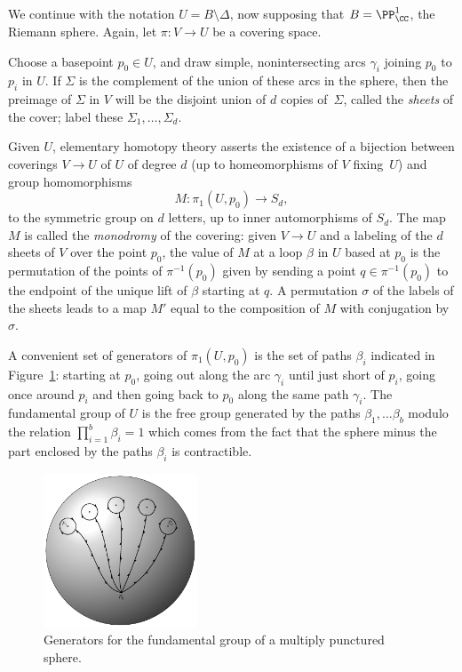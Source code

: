 We continue with the notation $U = B\setminus \Delta$, now supposing
%
that $B = \PP^1_\CC$, the Riemann sphere. Again, let $\pi:V\to U$ be a
covering space.

Choose a basepoint $p_0 \in U$, and draw simple, nonintersecting arcs
$\gamma_i$ joining $p_0$ to $p_i$ in $U$. If $\Sigma$ is the complement
of the union of these arcs in the sphere, then the preimage of $\Sigma$
in $V$ will be the disjoint union of $d$ copies of~$\Sigma$, called the
%
\emph{sheets} of the cover; label these $\Sigma_1,\dots,\Sigma_d$.

Given $U$, elementary homotopy theory asserts the existence of a bijection
between coverings $V \to U$ of $U$ of degree $d$ (up to homeomorphisms
of $V$ fixing~$U$) and group
homomorphisms
   $$
 M:  \pi_1(U, p_0) \to S_d,
   $$
to the symmetric group on $d$ letters, up to inner automorphisms of
%
%
$S_{d}$. The map $M$ is called the \emph{monodromy} of the covering:
given $V \to U$
and a labeling of the $d$ sheets of $V$ over the point
$p_0$, the value of $M$ at a loop  $\beta$ in $U$ based at $p_0$
is the
permutation of the points of $\pi^{-1}(p_0)$ given by sending a point
$q \in \pi^{-1}(p_0)$ to the endpoint of the unique lift of $\beta$
starting at $q$. A permutation $\sigma$ of the labels  of the sheets
leads to a map $M'$ equal to the composition of $M$ with conjugation
by $\sigma$.

A convenient set of generators of $ \pi_1(U, p_0)$ is the set of paths
$\beta_i$ indicated in Figure~\ref{pi 1 generators}: starting at $p_0$,
going out along the arc $\gamma_i$ until just short of $p_i$, going
once around $p_i$ and then going back to $p_0$ along the same path
$\gamma_i$. The fundamental group
%
%
 of $U$ is the free group generated
by the paths $\beta_1,\dots \beta_b$ \null modulo the relation $\prod_{i=1}^b
\beta_i = 1$
which comes from the fact that the sphere minus the part enclosed by
the paths $\beta_i$ is
contractible.
{\meshing\par}

\begin{figure}
\centerline{\includegraphics[height=1.8in]{main/Fig05-1}}
\vskip-6pt
 \caption{Generators for the fundamental group of a multiply punctured
 sphere.}
 \label{pi 1 generators}
\end{figure}

